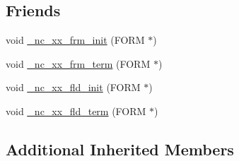 \subsection*{Friends}
\begin{DoxyCompactItemize}
\item 
void \hyperlink{class_n_curses_form_a9838e61b4998f789f38c6dc16aa15ffa}{\-\_\-nc\-\_\-xx\-\_\-frm\-\_\-init} (F\-O\-R\-M $\ast$)
\item 
void \hyperlink{class_n_curses_form_a0646a7d67fc82895e11a2ed9db5156f7}{\-\_\-nc\-\_\-xx\-\_\-frm\-\_\-term} (F\-O\-R\-M $\ast$)
\item 
void \hyperlink{class_n_curses_form_aa10ce0093ccb89c49cd4f1f8c2b23498}{\-\_\-nc\-\_\-xx\-\_\-fld\-\_\-init} (F\-O\-R\-M $\ast$)
\item 
void \hyperlink{class_n_curses_form_af2ba735e007e8cd936eb99ca54fce64f}{\-\_\-nc\-\_\-xx\-\_\-fld\-\_\-term} (F\-O\-R\-M $\ast$)
\end{DoxyCompactItemize}
\subsection*{Additional Inherited Members}


